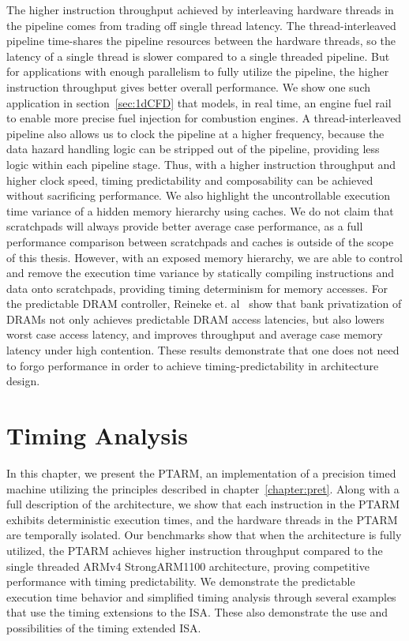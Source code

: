 The higher instruction throughput achieved by interleaving hardware threads in the pipeline comes from trading off single thread latency.   
The thread-interleaved pipeline time-shares the pipeline resources between the hardware threads, so the latency of a single thread is slower compared to a single threaded pipeline. 
But for applications with enough parallelism to fully utilize the pipeline, the higher instruction throughput gives better overall performance.
We show one such application in section~\ref{sec:1dCFD} that models, in real time, an engine fuel rail to enable more precise fuel injection for combustion engines.     
A thread-interleaved pipeline also allows us to clock the pipeline at a higher frequency, because the data hazard handling logic can be stripped out of the pipeline, providing less logic within each pipeline stage.
Thus, with a higher instruction throughput and higher clock speed, timing predictability and composability can be achieved without sacrificing performance.
We also highlight the uncontrollable execution time variance of a hidden memory hierarchy using caches.
We do not claim that scratchpads will always provide better average case performance, as a full performance comparison between scratchpads and caches is outside of the scope of this thesis. 
However, with an exposed memory hierarchy, we are able to control and remove the execution time variance by statically compiling instructions and data onto scratchpads, providing timing determinism for memory accesses.
For the predictable DRAM controller, Reineke et. al~\cite{ReinekeLiuPatelKimLee11_PRETDRAMControllerBankPrivatizationForPredictability} show that bank privatization of DRAMs not only achieves predictable DRAM access latencies, but also lowers worst case access latency, and improves throughput and average case memory latency under high contention. 
These results demonstrate that one does not need to forgo performance in order to achieve timing-predictability in architecture design.

\section{Timing Analysis}
\label{sec:wcet}


\bigskip

In this chapter, we present the PTARM, an implementation of a precision timed machine utilizing the principles described in chapter~\ref{chapter:pret}. 
Along with a full description of the architecture, we show that each instruction in the PTARM exhibits deterministic execution times, and the hardware threads in the PTARM are temporally isolated.
Our benchmarks show that when the architecture is fully utilized, the PTARM achieves higher instruction throughput compared to the single threaded ARMv4 StrongARM1100 architecture, proving competitive performance with timing predictability.
We demonstrate the predictable execution time behavior and simplified timing analysis through several examples that use the timing extensions to the ISA.
These also demonstrate the use and possibilities of the timing extended ISA. 
   
 
